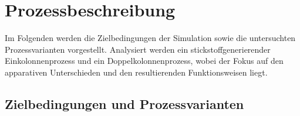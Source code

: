 \chapter{Prozessbeschreibung}
\label{ch:prozess}

Im Folgenden werden die Zielbedingungen der Simulation sowie die untersuchten Prozessvarianten vorgestellt. Analysiert werden ein stickstoffgenerierender Einkolonnenprozess und ein Doppelkolonnenprozess, wobei der Fokus auf den apparativen Unterschieden und den resultierenden Funktionsweisen liegt.

\section{Zielbedingungen und Prozessvarianten}
\label{sec:prozess_überblick}


